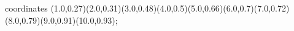 					coordinates { (1.0,0.27)(2.0,0.31)(3.0,0.48)(4.0,0.5)(5.0,0.66)(6.0,0.7)(7.0,0.72)(8.0,0.79)(9.0,0.91)(10.0,0.93)};